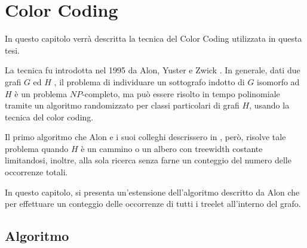 \chapter{Color Coding}
\label{cap 2}
In questo capitolo verr\`a descritta la tecnica del Color Coding utilizzata in questa tesi.

La tecnica fu introdotta nel 1995 da Alon, Yuster e Zwick \cite{alon1995color}.
In generale, dati due grafi $G$ ed $ H $ , il problema di individuare un sottografo indotto di $ G $ isomorfo ad $ H $ \`e un problema $ NP $-completo, ma pu\`o essere risolto in tempo polinomiale tramite un algoritmo randomizzato per classi particolari di grafi $ H $, usando la tecnica del color coding.

Il primo algoritmo che Alon e i suoi colleghi descrissero in \cite{alon1995color} , per\`o, risolve tale problema quando $ H $ \`e un cammino o un albero con treewidth costante limitandosi, inoltre, alla sola ricerca senza farne un conteggio del numero delle occorrenze totali.
 
In questo capitolo, si presenta un'estensione dell'algoritmo descritto da Alon \cite{alon1995color,bressan2018motif} che per effettuare un conteggio delle occorrenze di tutti i treelet all'interno del grafo.\\




\section{Algoritmo}
\label{section1}

